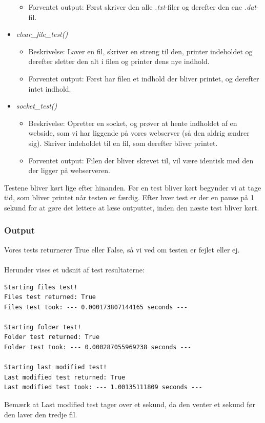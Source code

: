 \documentclass[11pt]{article}
\begin{document}
\begin{itemize}
\begin{itemize}
  \item Forventet output: Først skriver den alle \textit{.txt}-filer og derefter den ene \textit{.dat}-fil.
  \end{itemize}
\item \textit{clear\_file\_test()}
  \begin{itemize}
  \item Beskrivelse: Laver en fil, skriver en streng til den, printer indeholdet og derefter sletter den alt i filen og printer dens nye indhold.
  \item Forventet output: Først har filen et indhold der bliver printet, og derefter intet indhold.
  \end{itemize}
\item \textit{socket\_test()}
  \begin{itemize}
  \item Beskrivelse: Opretter en socket, og prøver at hente indholdet af en webside, som vi har liggende på vores webserver (så den aldrig ændrer sig). Skriver indeholdet til en fil, som derefter bliver printet.
  \item Forventet output: Filen der bliver skrevet til, vil være identisk med den der ligger på webserveren.
  \end{itemize}
\end{itemize}
Testene bliver kørt lige efter hinanden. Før en test bliver kørt begynder vi at tage tid, som bliver printet når testen er færdig. Efter hver test er der en pause på 1 sekund for at gøre det lettere at læse outputtet, inden den næste test bliver kørt.
\subsubsection{Output}
Vores tests returnerer True eller False, så vi ved om testen er fejlet eller ej. \\ \\
Herunder vises et udsnit af test resultaterne:
\begin{lstlisting}
Starting files test!
Files test returned: True
Files test took: --- 0.000173807144165 seconds ---

Starting folder test!
Folder test returned: True
Folder test took: --- 0.000287055969238 seconds ---

Starting last modified test!
Last modified test returned: True
Last modified test took: --- 1.00135111809 seconds ---
\end{lstlisting}
Bemærk at Last modified test tager over et sekund, da den venter et sekund før den laver den tredje fil.
\end{document}
